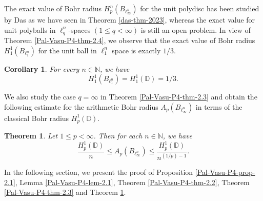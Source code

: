 \documentclass[a4paper,12pt]{amsart}
\newtheorem{thm}{Theorem}[section]
\newtheorem{cor}[equation]{Corollary}
\theoremstyle{definition}
\begin{document}
The exact value of Bohr radius $H^n_{p}(B_{\ell^n_{\infty}})$ for the unit polydisc has been studied by Das \cite{das-2023} as we have seen in Theorem \ref{das-thm-2023}, whereas the exact value for unit polyballs in $\ell^n_{q}$-spaces $(1\leq q<\infty)$ is still an open problem. In view of Theorem \ref{Pal-Vasu-P4-thm-2.4}, we observe that the exact value of Bohr radius $H^1_{1}(B_{\ell^n_{1}})$ for the unit ball in $\ell^n_{1}$ space is exactly $1/3$.
\begin{cor}\label{Pal-Vasu-P4-cor-2.5}
	For every $n\in \mathbb{N}$, we have 
	\begin{equation*}
		H^1_{1}(B_{\ell^n_{1}})=H^1_1(\mathbb{D})=1/3.
	\end{equation*}
\end{cor}
We also study the case $q=\infty$ in Theorem \ref{Pal-Vasu-P4-thm-2.3} and obtain the following estimate for the arithmetic Bohr radius $A_p(B_{\ell^n_{\infty}})$ in terms of the classical Bohr radius $H^1_{p}(\mathbb{D})$.
\begin{thm}\label{Pal-Vasu-P4-thm-2.5}
Let $1\leq p <\infty$. Then for each $n\in \mathbb{N}$, we have   
	\begin{equation*}
		\frac{H^1_p(\mathbb{D})}{n} \leq A_p(B_{\ell^n_{\infty}}) \leq \frac{H^1_p(\mathbb{D})}{n^{(1/p)-1}}.
	\end{equation*}
\end{thm}
In the following section, we present the proof of Proposition \ref{Pal-Vasu-P4-prop-2.1}, Lemma \ref{Pal-Vasu-P4-lem-2.1}, Theorem \ref{Pal-Vasu-P4-thm-2.2}, Theorem \ref{Pal-Vasu-P4-thm-2.3} and Theorem \ref{Pal-Vasu-P4-thm-2.5}.
\end{document}
